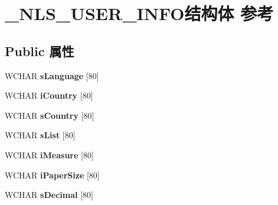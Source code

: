 \hypertarget{struct___n_l_s___u_s_e_r___i_n_f_o}{}\section{\+\_\+\+N\+L\+S\+\_\+\+U\+S\+E\+R\+\_\+\+I\+N\+F\+O结构体 参考}
\label{struct___n_l_s___u_s_e_r___i_n_f_o}
\subsection*{Public 属性}
\begin{DoxyCompactItemize}
\item 
\mbox{\label{struct___n_l_s___u_s_e_r___i_n_f_o_ab0978919f566f4938c517db174b5de33}} 
W\+C\+H\+AR {\bfseries s\+Language} \mbox{[}80\mbox{]}
\item 
\mbox{\label{struct___n_l_s___u_s_e_r___i_n_f_o_acfa2a6543650db0f7a075ea0f33fd91b}} 
W\+C\+H\+AR {\bfseries i\+Country} \mbox{[}80\mbox{]}
\item 
\mbox{\label{struct___n_l_s___u_s_e_r___i_n_f_o_a035f15b199e3816dbe79d0ca0eff14ae}} 
W\+C\+H\+AR {\bfseries s\+Country} \mbox{[}80\mbox{]}
\item 
\mbox{\label{struct___n_l_s___u_s_e_r___i_n_f_o_a0ee39581c4de594b7ef73e3ec1498c8f}} 
W\+C\+H\+AR {\bfseries s\+List} \mbox{[}80\mbox{]}
\item 
\mbox{\label{struct___n_l_s___u_s_e_r___i_n_f_o_aa6d5dc35318c3aed167505864ee7c66d}} 
W\+C\+H\+AR {\bfseries i\+Measure} \mbox{[}80\mbox{]}
\item 
\mbox{\label{struct___n_l_s___u_s_e_r___i_n_f_o_a2ec1f3faefc43f7a36b2dcb437d5097b}} 
W\+C\+H\+AR {\bfseries i\+Paper\+Size} \mbox{[}80\mbox{]}
\item 
\mbox{\label{struct___n_l_s___u_s_e_r___i_n_f_o_afb4b185d6424a2319a5a68475d9c3384}} 
W\+C\+H\+AR {\bfseries s\+Decimal} \mbox{[}80\mbox{]}
\item 

\end{DoxyCompactItemize}

